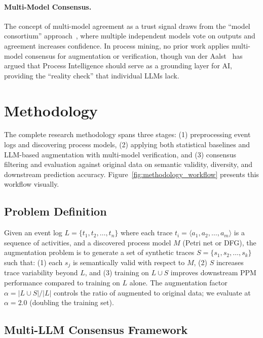 \documentclass[11pt,a4paper]{article}
\begin{document}
\paragraph{Multi-Model Consensus.}
The concept of multi-model agreement as a trust signal draws from the ``model consortium'' approach~\cite{karpathy2024consortium}, where multiple independent models vote on outputs and agreement increases confidence. In process mining, no prior work applies multi-model consensus for augmentation or verification, though van der Aalst~\cite{vanderaalst2025noai} has argued that Process Intelligence should serve as a grounding layer for AI, providing the ``reality check'' that individual LLMs lack.


\section{Methodology}

The complete research methodology spans three stages: (1) preprocessing event logs and discovering process models, (2) applying both statistical baselines and LLM-based augmentation with multi-model verification, and (3) consensus filtering and evaluation against original data on semantic validity, diversity, and downstream prediction accuracy. Figure~\ref{fig:methodology_workflow} presents this workflow visually.



\subsection{Problem Definition}

Given an event log $L = \{t_1, t_2, \ldots, t_n\}$ where each trace $t_i = \langle a_1, a_2, \ldots, a_m \rangle$ is a sequence of activities, and a discovered process model $M$ (Petri net or DFG), the augmentation problem is to generate a set of synthetic traces $S = \{s_1, s_2, \ldots, s_k\}$ such that: (1) each $s_j$ is semantically valid with respect to $M$, (2) $S$ increases trace variability beyond $L$, and (3) training on $L \cup S$ improves downstream PPM performance compared to training on $L$ alone. The augmentation factor $\alpha = |L \cup S| / |L|$ controls the ratio of augmented to original data; we evaluate at $\alpha = 2.0$ (doubling the training set).

\subsection{Multi-LLM Consensus Framework}
\end{document}
